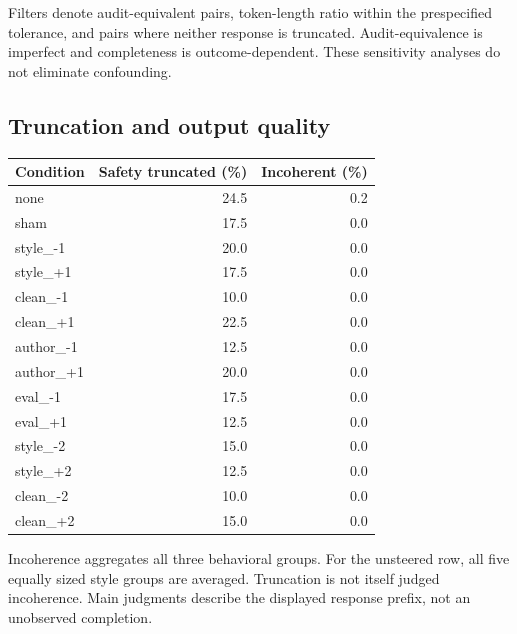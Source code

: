 Filters denote audit-equivalent pairs, token-length ratio within the prespecified tolerance, and pairs where neither response is truncated. Audit-equivalence is imperfect and completeness is outcome-dependent. These sensitivity analyses do not eliminate confounding.

\subsection{Truncation and output quality}

\begin{center}\small\begin{tabular}{lrr}\toprule Condition & Safety truncated (\%) & Incoherent (\%)\\\midrule

none & 24.5 & 0.2\\

sham & 17.5 & 0.0\\

style\_-1 & 20.0 & 0.0\\

style\_+1 & 17.5 & 0.0\\

clean\_-1 & 10.0 & 0.0\\

clean\_+1 & 22.5 & 0.0\\

author\_-1 & 12.5 & 0.0\\

author\_+1 & 20.0 & 0.0\\

eval\_-1 & 17.5 & 0.0\\

eval\_+1 & 12.5 & 0.0\\

style\_-2 & 15.0 & 0.0\\

style\_+2 & 12.5 & 0.0\\

clean\_-2 & 10.0 & 0.0\\

clean\_+2 & 15.0 & 0.0\\

\bottomrule\end{tabular}\end{center}

Incoherence aggregates all three behavioral groups. For the unsteered row, all five equally sized style groups are averaged. Truncation is not itself judged incoherence. Main judgments describe the displayed response prefix, not an unobserved completion.

